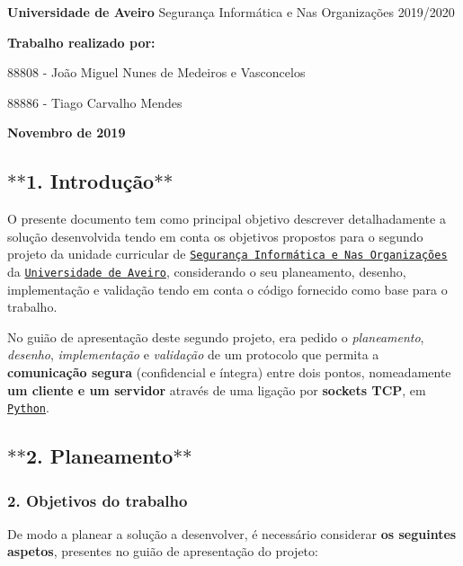 {\bfseries Universidade de Aveiro} Segurança Informática e Nas Organizações 2019/2020

{\bfseries Trabalho realizado por\+:}


\begin{DoxyItemize}
\item 88808 -\/ João Miguel Nunes de Medeiros e Vasconcelos
\item 88886 -\/ Tiago Carvalho Mendes
\end{DoxyItemize}

{\bfseries Novembro de 2019}

\subsection*{$\ast$$\ast$1. Introdução$\ast$$\ast$}

O presente documento tem como principal objetivo descrever detalhadamente a solução desenvolvida tendo em conta os objetivos propostos para o segundo projeto da unidade curricular de \href{https://www.ua.pt/pt/uc/4143}{\tt Segurança Informática e Nas Organizações} da \href{www.ua.pt}{\tt Universidade de Aveiro}, considerando o seu planeamento, desenho, implementação e validação tendo em conta o código fornecido como base para o trabalho.

No guião de apresentação deste segundo projeto, era pedido o {\itshape planeamento}, {\itshape desenho}, {\itshape implementação} e {\itshape validação} de um protocolo que permita a {\bfseries comunicação segura} (confidencial e íntegra) entre dois pontos, nomeadamente {\bfseries um cliente e um servidor} através de uma ligação por {\bfseries sockets T\+CP}, em \href{https://realpython.com/python-sockets/}{\tt Python}.

\subsection*{$\ast$$\ast$2. Planeamento$\ast$$\ast$}

\subsubsection*{2. Objetivos do trabalho}

De modo a planear a solução a desenvolver, é necessário considerar {\bfseries os seguintes aspetos}, presentes no guião de apresentação do projeto\+:


